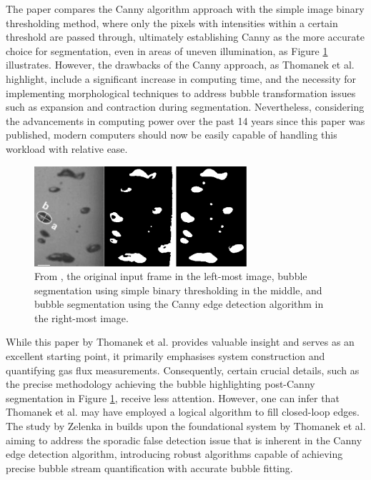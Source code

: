The paper compares the Canny algorithm approach with the simple image binary thresholding method, where only the pixels with intensities within a certain threshold are passed through, ultimately establishing Canny as the more accurate choice for segmentation, even in areas of uneven illumination, as Figure \ref{fig:canny_segmentation_compare} illustrates. However, the drawbacks of the Canny approach, as Thomanek et al. highlight, include a significant increase in computing time, and the necessity for implementing morphological techniques to address bubble transformation issues such as expansion and contraction during segmentation. Nevertheless, considering the advancements in computing power over the past 14 years since this paper was published, modern computers should now be easily capable of handling this workload with relative ease.

\begin{figure}[H]
    \centering
    \includegraphics[width=0.7\textwidth]{assets/bubble-segmentation-canny-thresholding.png}
    \caption{From \cite{thomanekAutomatedGasBubble2010}, the original input frame in the left-most image, bubble segmentation using simple binary thresholding in the middle, and bubble segmentation using the Canny edge detection algorithm in the right-most image.}
    \label{fig:canny_segmentation_compare}
\end{figure}

While this paper by Thomanek et al. provides valuable insight and serves as an excellent starting point, it primarily emphasises system construction and quantifying gas flux measurements. Consequently, certain crucial details, such as the precise methodology achieving the bubble highlighting post-Canny segmentation in Figure \ref{fig:canny_segmentation_compare}, receive less attention. However, one can infer that Thomanek et al. may have employed a logical algorithm to fill closed-loop edges. The study by Zelenka in \cite{zelenkaGasBubbleShape2014a} builds upon the foundational system by Thomanek et al. aiming to address the sporadic false detection issue that is inherent in the Canny edge detection algorithm, introducing robust algorithms capable of achieving precise bubble stream quantification with accurate bubble fitting.

